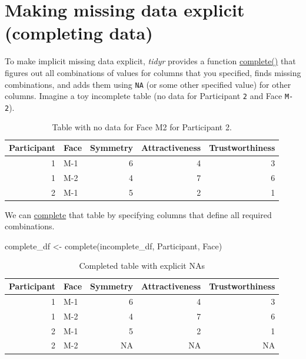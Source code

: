 \documentclass[
]{book}
\newenvironment{Shaded}{\begin{snugshade}}{\end{snugshade}}
\newcommand{\FunctionTok}[1]{\textcolor[rgb]{0.00,0.00,0.00}{#1}}
\newcommand{\NormalTok}[1]{#1}
\newcommand{\OtherTok}[1]{\textcolor[rgb]{0.56,0.35,0.01}{#1}}
\begin{document}
\hypertarget{complete}{%
\section{Making missing data explicit (completing data)}\label{complete}}

To make implicit missing data explicit, \emph{tidyr} provides a function \href{https://tidyr.tidyverse.org/reference/complete.html}{complete()} that figures out all combinations of values for columns that you specified, finds missing combinations, and adds them using \texttt{NA} (or some other specified value) for other columns. Imagine a toy incomplete table (no data for Participant \texttt{2} and Face \texttt{M-2}).

\begin{table}

\caption{\label{tab:unnamed-chunk-275}Table with no data for Face M2 for Participant 2.}
\centering
\begin{tabular}[t]{r|l|r|r|r}
\hline
Participant & Face & Symmetry & Attractiveness & Trustworthiness\\
\hline
1 & M-1 & 6 & 4 & 3\\
\hline
1 & M-2 & 4 & 7 & 6\\
\hline
2 & M-1 & 5 & 2 & 1\\
\hline
\end{tabular}
\end{table}

We can \href{https://tidyr.tidyverse.org/reference/complete.html}{complete} that table by specifying columns that define all required combinations.

\begin{Shaded}
\begin{Highlighting}[]
\NormalTok{complete\_df }\OtherTok{\textless{}{-}} \FunctionTok{complete}\NormalTok{(incomplete\_df, Participant, Face)}
\end{Highlighting}
\end{Shaded}

\begin{table}

\caption{\label{tab:unnamed-chunk-277}Completed table with explicit NAs}
\centering
\begin{tabular}[t]{r|l|r|r|r}
\hline
Participant & Face & Symmetry & Attractiveness & Trustworthiness\\
\hline
1 & M-1 & 6 & 4 & 3\\
\hline
1 & M-2 & 4 & 7 & 6\\
\hline
2 & M-1 & 5 & 2 & 1\\
\hline
2 & M-2 & NA & NA & NA\\
\hline
\end{tabular}
\end{table}
\end{document}
